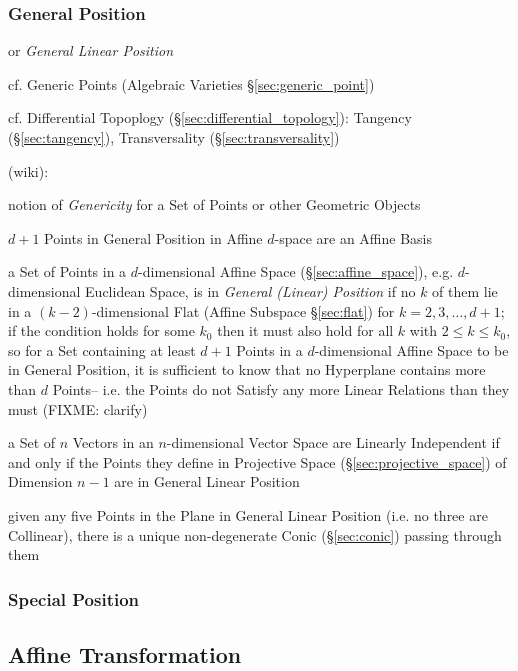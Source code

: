 \subsubsection{General Position}\label{sec:general_position}

or \emph{General Linear Position}

\fist cf. Generic Points (Algebraic Varieties \S\ref{sec:generic_point})

\fist cf. Differential Topoplogy (\S\ref{sec:differential_topology}): Tangency
(\S\ref{sec:tangency}), Transversality (\S\ref{sec:transversality})

(wiki):

notion of \emph{Genericity} for a Set of Points or other Geometric Objects

$d+1$ Points in General Position in Affine $d$-space are an Affine Basis

a Set of Points in a $d$-dimensional Affine Space (\S\ref{sec:affine_space}),
e.g. $d$-dimensional Euclidean Space, is in \emph{General (Linear) Position} if
no $k$ of them lie in a $(k-2)$-dimensional Flat (Affine Subspace
\S\ref{sec:flat}) for $k = 2,3,\ldots,d+1$; if the condition holds for some
$k_0$ then it must also hold for all $k$ with $2 \leq k \leq k_0$, so for a
Set containing at least $d+1$ Points in a $d$-dimensional Affine Space to be in
General Position, it is sufficient to know that no Hyperplane contains more
than $d$ Points-- i.e. the Points do not Satisfy any more Linear Relations than
they must (FIXME: clarify)

a Set of $n$ Vectors in an $n$-dimensional Vector Space are Linearly
Independent if and only if the Points they define in Projective Space
(\S\ref{sec:projective_space}) of Dimension $n-1$ are in General Linear
Position

given any five Points in the Plane in General Linear Position (i.e. no three
are Collinear), there is a unique non-degenerate Conic (\S\ref{sec:conic})
passing through them



\subsubsection{Special Position}\label{sec:special_position}



\subsection{Affine Transformation}\label{sec:affine_transformation}


